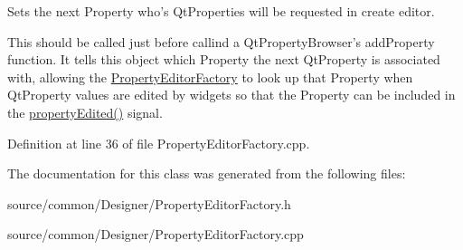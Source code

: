 Sets the next Property who's Qt\-Properties will be requested in create editor. 

This should be called just before callind a Qt\-Property\-Browser's add\-Property function. It tells this object which Property the next Qt\-Property is associated with, allowing the \hyperlink{class_property_editor_factory}{Property\-Editor\-Factory} to look up that Property when Qt\-Property values are edited by widgets so that the Property can be included in the \hyperlink{class_property_editor_factory_af08e17ed7bfc43dee7cbce5ed9e00e7f}{property\-Edited()} signal. 

Definition at line 36 of file Property\-Editor\-Factory.\-cpp.



The documentation for this class was generated from the following files\-:\begin{DoxyCompactItemize}
\item 
source/common/\-Designer/Property\-Editor\-Factory.\-h\item 
source/common/\-Designer/Property\-Editor\-Factory.\-cpp\end{DoxyCompactItemize}
